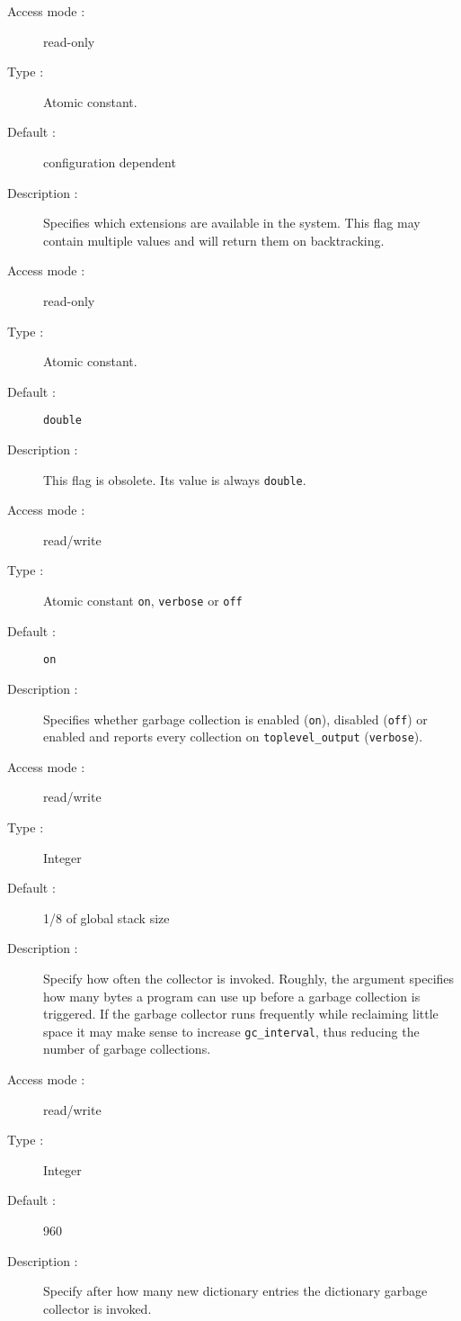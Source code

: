 \begin{description}
\pagebreak[3]
\begin{description}
\item[Access mode :] read-only
\item[Type :] Atomic constant.
\item[Default : ] configuration dependent
\item[Description :] Specifies which extensions are available in the system.
This flag may contain multiple values and will return them on backtracking.
\end{description}

\begin{description}
\item[Access mode :] read-only
\item[Type :] Atomic constant.
\item[Default : ] {\tt double}
\item[Description :] This flag is obsolete. Its value is always {\tt double}.
\end{description}

\begin{description}
\item[Access mode : ] read/write
\item[Type : ] Atomic constant {\tt on}, {\tt verbose} or {\tt off}
\item[Default : ] {\tt on}
\item[Description : ] Specifies whether garbage collection is enabled
({\tt on}), disabled ({\tt off}) or enabled and reports every collection
on {\tt toplevel_output} ({\tt verbose}).
\end{description}

\begin{description}
\item[Access mode : ] read/write
\item[Type : ] Integer
\item[Default : ] 1/8 of global stack size
\item[Description : ]
Specify how often the collector is invoked. Roughly, the argument
specifies how many bytes a program can use up before
a garbage collection is triggered.
If the garbage collector runs frequently while reclaiming little space
it may make sense to increase {\tt gc_interval}, thus reducing the number
of garbage collections.
\end{description}

\begin{description}
\item[Access mode : ] read/write
\item[Type : ] Integer
\item[Default : ] 960
\item[Description : ]
Specify after how many new dictionary entries the dictionary gar\-bage collector is invoked.
\end{description}


\end{description}
